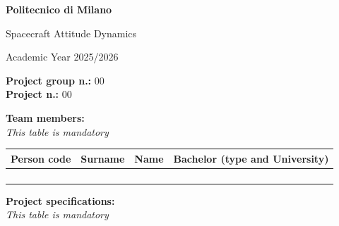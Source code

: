 \documentclass[a4paper,12pt]{article}
\newcommand{\GroupNumber}{00}
\newcommand{\ProjectNumber}{00}
\begin{document}

\begin{titlepage}
    \thispagestyle{plain}

    \centering
    {\LARGE \textbf{Politecnico di Milano}\par}
    \vspace{1cm}
    {\Large Spacecraft Attitude Dynamics\par}
    \vspace{0.5cm}
    {\large Academic Year 2025/2026\par}

    \vspace{2cm}

    \begin{flushleft}
        \large
        \textbf{Project group n.:} \GroupNumber \\[0.5cm]
        \textbf{Project n.:} \ProjectNumber
    \end{flushleft}

    \vspace{0.5cm}

    \begin{flushleft}
        \textbf{Team members:} \\
        \textit{This table is mandatory}
    \end{flushleft}

    \begin{tabularx}{\textwidth}{|X|X|X|X|}
        \hline
        \textbf{Person code} & \textbf{Surname} & \textbf{Name} & \textbf{Bachelor (type and University)} \\
        \hline
        & & & \\ \hline
        & & & \\ \hline
        & & & \\ \hline
        & & & \\ \hline
    \end{tabularx}

    \vspace{1cm}

    \begin{flushleft}
        \textbf{Project specifications:} \\
        \textit{This table is mandatory}
    \end{flushleft}


\end{titlepage}
\end{document}
